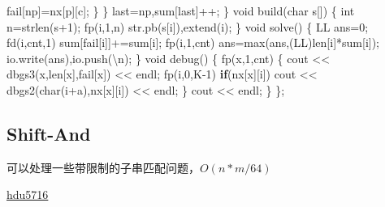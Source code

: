 \documentclass[
]{article}
\newenvironment{Shaded}{}{}
\newcommand{\CharTok}[1]{\textcolor[rgb]{0.25,0.44,0.63}{#1}}
\newcommand{\ControlFlowTok}[1]{\textcolor[rgb]{0.00,0.44,0.13}{\textbf{#1}}}
\newcommand{\DataTypeTok}[1]{\textcolor[rgb]{0.56,0.13,0.00}{#1}}
\newcommand{\DecValTok}[1]{\textcolor[rgb]{0.25,0.63,0.44}{#1}}
\newcommand{\NormalTok}[1]{#1}
\newcommand{\SpecialCharTok}[1]{\textcolor[rgb]{0.25,0.44,0.63}{#1}}
\begin{document}
\begin{Shaded}
\begin{Highlighting}[]
\NormalTok{                fail[np]=nx[p][c];}
\NormalTok{            \}}
\NormalTok{        \}}
\NormalTok{        last=np,sum[last]++;}
\NormalTok{    \}}
    \DataTypeTok{void}\NormalTok{ build(}\DataTypeTok{char}\NormalTok{ s[])}
\NormalTok{    \{}
        \DataTypeTok{int}\NormalTok{ n=strlen(s+}\DecValTok{1}\NormalTok{);}
\NormalTok{        fp(i,}\DecValTok{1}\NormalTok{,n) str.pb(s[i]),extend(i);}
\NormalTok{    \}}
    \DataTypeTok{void}\NormalTok{ solve()}
\NormalTok{    \{}
\NormalTok{        LL ans=}\DecValTok{0}\NormalTok{;}
\NormalTok{        fd(i,cnt,}\DecValTok{1}\NormalTok{) sum[fail[i]]+=sum[i];}
\NormalTok{        fp(i,}\DecValTok{1}\NormalTok{,cnt) ans=max(ans,(LL)len[i]*sum[i]);}
\NormalTok{        io.write(ans),io.push(}\CharTok{\textquotesingle{}}\SpecialCharTok{\textbackslash{}n}\CharTok{\textquotesingle{}}\NormalTok{);}
\NormalTok{    \}}
    \DataTypeTok{void}\NormalTok{ debug()}
\NormalTok{    \{}
\NormalTok{        fp(x,}\DecValTok{1}\NormalTok{,cnt)}
\NormalTok{        \{}
\NormalTok{            cout \textless{}\textless{} dbgs3(x,len[x],fail[x]) \textless{}\textless{} endl;}
\NormalTok{            fp(i,}\DecValTok{0}\NormalTok{,K{-}}\DecValTok{1}\NormalTok{) }\ControlFlowTok{if}\NormalTok{(nx[x][i]) cout \textless{}\textless{} dbgs2(}\DataTypeTok{char}\NormalTok{(i+}\CharTok{\textquotesingle{}a\textquotesingle{}}\NormalTok{),nx[x][i]) \textless{}\textless{} endl;}
\NormalTok{        \}}
\NormalTok{        cout \textless{}\textless{} endl;}
\NormalTok{    \}}
\NormalTok{\};}
\end{Highlighting}
\end{Shaded}

\hypertarget{shift-and}{%
\subsection{Shift-And}\label{shift-and}}

可以处理一些带限制的子串匹配问题，\(O(n*m/64)\)

\href{http://acm.hdu.edu.cn/showproblem.php?pid=5716}{hdu5716}
\end{document}
